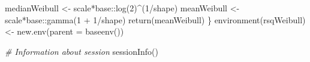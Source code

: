 \documentclass[
]{article}
\newenvironment{Shaded}{\begin{snugshade}}{\end{snugshade}}
\newcommand{\AttributeTok}[1]{\textcolor[rgb]{0.77,0.63,0.00}{#1}}
\newcommand{\CommentTok}[1]{\textcolor[rgb]{0.56,0.35,0.01}{\textit{#1}}}
\newcommand{\DecValTok}[1]{\textcolor[rgb]{0.00,0.00,0.81}{#1}}
\newcommand{\FunctionTok}[1]{\textcolor[rgb]{0.00,0.00,0.00}{#1}}
\newcommand{\NormalTok}[1]{#1}
\newcommand{\OtherTok}[1]{\textcolor[rgb]{0.56,0.35,0.01}{#1}}
\newcommand{\SpecialCharTok}[1]{\textcolor[rgb]{0.00,0.00,0.00}{#1}}
\begin{document}
\begin{Shaded}
\begin{Highlighting}[]
\NormalTok{  medianWeibull }\OtherTok{\textless{}{-}}\NormalTok{ scale}\SpecialCharTok{*}\NormalTok{base}\SpecialCharTok{::}\FunctionTok{log}\NormalTok{(}\DecValTok{2}\NormalTok{)}\SpecialCharTok{\^{}}\NormalTok{(}\DecValTok{1}\SpecialCharTok{/}\NormalTok{shape)}
\NormalTok{  meanWeibull }\OtherTok{\textless{}{-}}\NormalTok{ scale}\SpecialCharTok{*}\NormalTok{base}\SpecialCharTok{::}\FunctionTok{gamma}\NormalTok{(}\DecValTok{1} \SpecialCharTok{+} \DecValTok{1}\SpecialCharTok{/}\NormalTok{shape)}
  \FunctionTok{return}\NormalTok{(meanWeibull)}
\NormalTok{\}}
\FunctionTok{environment}\NormalTok{(rsqWeibull) }\OtherTok{\textless{}{-}} \FunctionTok{new.env}\NormalTok{(}\AttributeTok{parent =} \FunctionTok{baseenv}\NormalTok{())}

\CommentTok{\# Information about session}
\FunctionTok{sessionInfo}\NormalTok{()}
\end{Highlighting}
\end{Shaded}
\end{document}
